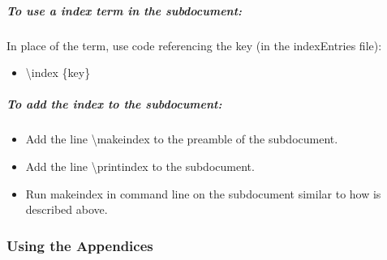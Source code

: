 \documentclass[class=book , crop=false]{standalone}
\begin{document}
\subparagraph[Using an index term]{To use a index term in the subdocument:\texorpdfstring{\\}{}}
In place of the term, use code referencing the key (in the indexEntries file):

\begin{itemize}
\item \textbackslash index \{key\}
\end{itemize}

\subparagraph{To add the index to the subdocument:}
\begin{itemize}
\item Add the line \textbackslash makeindex to the preamble of the subdocument.
\item Add the line \textbackslash printindex to the subdocument.
\item Run makeindex in command line on the subdocument similar to how is described above.

\end{itemize}


\subsubsection[Using the Appendices]{{\Large Using the Appendices}}
\end{document}

